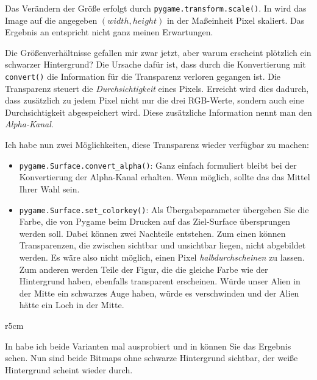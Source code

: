 Das Verändern der Größe erfolgt durch \texttt{pygame\-.trans\-form\-.scale()}. In  wird das Image auf die angegeben $(width, height)$ in der Maßeinheit Pixel skaliert. Das Ergebnis an  entspricht nicht ganz meinen Erwartungen.  

Die Größenverhältnisse gefallen mir zwar jetzt, aber warum erscheint plötzlich ein schwarzer Hintergrund? Die Ursache dafür ist, dass durch die Konvertierung mit \texttt{convert()} die Information für die Transparenz verloren gegangen ist. Die Transparenz steuert die \emph{Durchsichtigkeit} eines Pixels. Erreicht wird dies dadurch, dass zusätzlich zu jedem Pixel nicht nur die drei RGB-Werte, sondern auch eine Durchsichtigkeit abgespeichert wird. Diese zusätzliche Information nennt man den \emph{Alpha-Kanal}.

Ich habe nun zwei Möglichkeiten, diese Transparenz wieder verfügbar zu machen:
\begin{itemize}
	\item \texttt{pygame.Surface.convert\_alpha()}: Ganz einfach formuliert bleibt bei der Konvertierung der Alpha-Kanal erhalten. Wenn möglich, sollte das das Mittel Ihrer Wahl sein.
	
	\item \texttt{pygame.Surface.set\_colorkey()}: Als Übergabeparameter übergeben Sie die Farbe, die von Pygame beim Drucken auf das Ziel-Surface übersprungen werden soll. Dabei können zwei Nachteile entstehen. Zum einen können Transparenzen, die zwischen sichtbar und unsichtbar liegen, nicht abgebildet werden. Es wäre also nicht möglich, einen Pixel \emph{halbdurchscheinen} zu lassen. Zum anderen werden Teile der Figur, die die gleiche Farbe wie der Hintergrund haben, ebenfalls transparent erscheinen. Würde unser Alien in der Mitte ein schwarzes Auge haben, würde es verschwinden und der Alien hätte ein Loch in der Mitte.
\end{itemize}



\begin{wrapfigure}[9]{r}{5cm}
    \vspace{-1.5em}
\end{wrapfigure}In  habe ich beide Varianten mal ausprobiert und in  können Sie das Ergebnis sehen. Nun sind beide Bitmaps ohne schwarze Hintergrund sichtbar, der weiße Hintergrund scheint wieder durch.

